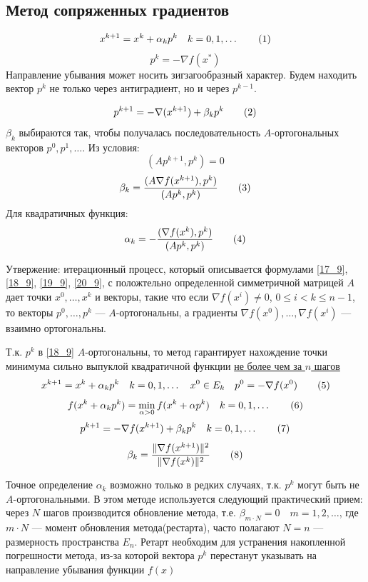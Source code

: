 \documentclass[oneside]{book}
\newcommand\addtag{\refstepcounter{equation}\tag{\theequation}}
\theoremstyle{plain}
\theoremstyle{remark}
\theoremstyle{definition}
\begin{document}
\chapter{}
\label{sec:org4cd6d51}
\section{Метод сопряженных градиентов}
\label{sec:org76b94fb}
\[ x^{k + 1} = x^k + \alpha_k p^k \quad k = 0,1,\dots \addtag\label{17_9}\]
\[ p^k = - \nabla f(x^*) \]
Направление убывания может носить зигзагообразный характер. Будем находить вектор \(p^k\) не только через антиградиент, но и через \(p^{k - 1}\).

\[ p^{k + 1} = - \nabla(x^{k + 1}) + \beta_k p^k \addtag\label{18_9}\]
\(\beta_k\) выбираются так, чтобы получалась последовательность \(A\)-ортогональных векторов \(p^0, p^1, \dots\). Из условия:
\[ (Ap^{k + 1}, p^k) = 0 \]
\[ \beta_k = \frac{(A \nabla f(x^{k + 1}), p^k)}{(Ap^k, p^k)} \addtag\label{19_9}\]
Для квадратичных функция:
\[ \alpha_k = -\frac{(\nabla f(x^k), p^k)}{(Ap^k, p^k)} \addtag\label{20_9}\]

Утвержение: итерационный процесс, который описывается формулами \ref{17_9}, \ref{18_9}, \ref{19_9}, \ref{20_9}, с положтельно определенной симметричной матрицей \(A\) дает точки \(x^0,\dots,x^k\) и векторы, такие что если \(\nabla f(x^i) \neq 0\), \(0 \le i < k \le n - 1\), то векторы \(p^0,\dots,p^k\) --- \(A\)-ортогональны, а градиенты \(\nabla f(x^0), \dots, \nabla f(x^i)\) --- взаимно ортогональны.

Т.к. \(p^k\) в \ref{18_9} \(A\)-ортогональны, то метод гарантирует нахождение точки минимума сильно выпуклой квадратичной функции \uline{не более чем за \(n\) шагов}
\[ x^{k + 1} = x^k + \alpha_k p^k \quad k = 0,1,\dots\quad x^0 \in E_k\quad p^0 = - \nabla f(x^0) \addtag\label{21_9}\]
\[ f(x^k + \alpha_k p^k) = \min_{\alpha > 0} f(x^k + \alpha p^k)\quad k = 0,1, \dots \addtag\label{22_9}\]
\[ p^{k + 1} = -\nabla f(x^{k + 1}) + \beta_k p^k\quad k = 0,1,\dots \addtag\label{23_9}\]
\[ \beta_k = \frac{\Vert \nabla f(x^{k + 1}) \Vert ^2}{\Vert \nabla f(x^k) \Vert ^2} \addtag\label{24_9}\]

Точное определение \(\alpha_k\) возможно только в редких случаях, т.к. \(p^k\) могут быть не \(A\)-ортогональными. В этом методе используется следующий практический прием: через \(N\) шагов производится обновление метода, т.е. \(\beta_{m\cdot N} = 0\quad m = 1, 2, \dots\), где \(m\cdot N\) --- момент обновления метода(рестарта), часто полагают \(N = n\) --- размерность пространства \(E_n\). Ретарт необходим для устранения накопленной погрешности метода, из-за которой вектора \(p^k\) перестанут указывать на направление убывания функции \(f(x)\) 
\end{document}
